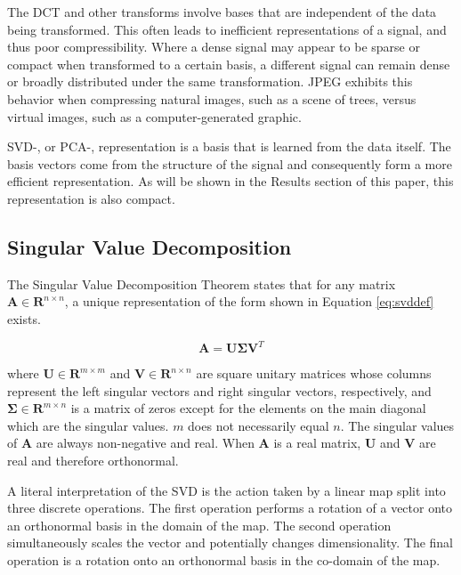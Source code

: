 \documentclass[conference]{IEEEtran}
\begin{document}
    The DCT and other transforms involve bases that are independent of the data being transformed. This often leads to inefficient representations of a signal, and thus poor compressibility. Where a dense signal may appear to be sparse or compact when transformed to a certain basis, a different signal can remain dense or broadly distributed under the same transformation. JPEG exhibits this behavior when compressing natural images, such as a scene of trees, versus virtual images, such as a computer-generated graphic.
    
    SVD-, or PCA-, representation is a basis that is learned from the data itself. The basis vectors come from the structure of the signal and consequently form a more efficient representation. As will be shown in the Results section of this paper, this representation is also compact.
    
    \subsection{Singular Value Decomposition}
    The Singular Value Decomposition Theorem states that for any matrix $\mathbf{A} \in \mathbf{R}^{n \times n}$, a unique representation of the form shown in Equation \ref{eq:svddef} exists.

    \begin{equation}
        \mathbf{A} = \mathbf{U\Sigma }{\mathbf{V}^T}
    \label{eq:svddef}
    \end{equation}

    where $\mathbf{U} \in \mathbf{R}^{m \times m}$ and $\mathbf{V} \in \mathbf{R}^{n \times n}$ are square unitary
    matrices whose columns represent the left singular vectors and right singular vectors, respectively, and $\mathbf{\Sigma} \in \mathbf{R}^{m \times n}$ is a matrix of zeros except for the elements on the main diagonal which are the singular values. $m$ does not necessarily equal $n$. The singular values of $\mathbf{A}$ are always non-negative and real. When $\mathbf{A}$ is a real matrix, $\mathbf{U}$ and $\mathbf{V}$ are real and therefore orthonormal.

    A literal interpretation of the SVD is the action taken by a linear map split into three discrete operations. The first operation performs a rotation of a vector onto an orthonormal basis in the domain of the map. The second operation simultaneously scales the vector and potentially changes dimensionality. The final operation is a rotation onto an orthonormal basis in the co-domain of the map.
\end{document}
